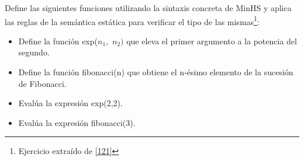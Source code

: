\bigskip

    \begin{exercise}
        Define las siguientes funciones utilizando la sintaxis concreta de \textsf{MinHS} y aplica las reglas de la semántica estática para verificar el tipo de las mismas\footnote{Ejercicio extraído de \hyperlink{121}{[121]}}:\\
        \begin{itemize}
            \item Define la función \textsf{exp}($n_1, $ $n_2)$ que eleva el primer argumento a la potencia del segundo.
            \item Define la función \textsf{fibonacci}(n) que obtiene el n-ésimo elemento de la sucesión de Fibonacci.
            \item Evalúa la expresión \textsf{exp}(2,2).
	 \item Evalúa la expresión \textsf{fibonacci}(3).
        \end{itemize}
    \end{exercise}

\bigskip



